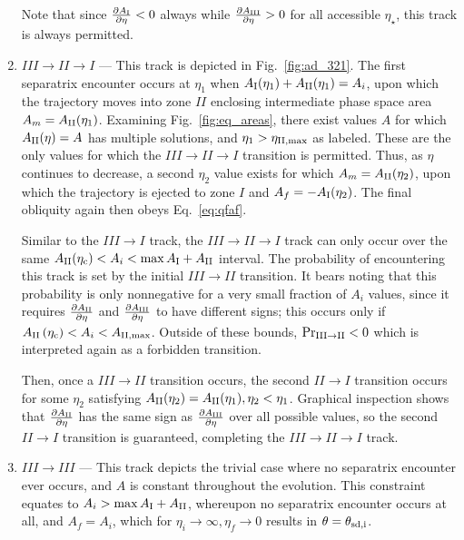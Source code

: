 \documentclass[
        fleqn,
        usenatbib,
        referee,
    ]{mnras}
\newcommand*{\pd}[2]{\frac{\partial#1}{\partial#2}}
\newcommand*{\p}[1]{\left(#1\right)}
\begin{document}
\begin{enumerate}
        Note that since $\pd{A_{\rm I}}{\eta} < 0$ always while $\pd{A_{\rm
        III}}{\eta} > 0$ for all accessible $\eta_{\star}$, this track is always
        permitted.

    \item $III \to II \to I$ --- This track is depicted in Fig.~\ref{fig:ad_321}.
        The first separatrix encounter occurs at $\eta_1$ when $A_{\rm
        I}(\eta_1) + A_{\rm II}(\eta_1) = A_i$, upon which the trajectory moves
        into zone $II$ enclosing intermediate phase space area $A_m = A_{\rm
        II}(\eta_1)$. Examining Fig.~\ref{fig:eq_areas}, there exist values $A$
        for which $A_{\rm II}(\eta) = A$ has multiple solutions, and $\eta_1 >
        \eta_{\rm II, \max}$ as labeled. These are the only values for which the
        $III \to II \to I$ transition is permitted. Thus, as $\eta$ continues to
        decrease, a second $\eta_2$ value exists for which $A_m = A_{\rm
        II}(\eta_2)$, upon which the trajectory is ejected to zone $I$ and $A_f
        = -A_{\rm I}(\eta_2)$. The final obliquity again then obeys
        Eq.~\eqref{eq:qfaf}.

        Similar to the $III \to I$ track, the $III \to II \to I$ track can only
        occur over the same $A_{\rm II}(\eta_{\rm c}) < A_i < \max A_{\rm I} + A_{\rm
        II}$ interval. The probability of encountering this track is set by the
        initial $III \to II$ transition. It bears noting that this probability
        is only nonnegative for a very small fraction of $A_i$ values, since it
        requires $\pd{A_{\rm II}}{\eta}$ and $\pd{A_{\rm III}}{\eta}$ to have
        different signs; this occurs only if $A_{\rm II}\p{\eta_{\rm c}} < A_i <
        A_{\rm II, \max}$. Outside of these bounds, $\Pr_{\rm III \to II} < 0$
        which is interpreted again as a forbidden transition.

        Then, once a $III \to II$ transition occurs, the second $II \to I$
        transition occurs for some $\eta_2$ satisfying $A_{\rm II}(\eta_2) =
        A_{\rm II}(\eta_1), \eta_2 < \eta_1$. Graphical inspection shows that
        $\pd{A_{\rm II}}{\eta}$ has the same sign as $\pd{A_{\rm III}}{\eta}$
        over all possible values, so the second $II \to I$ transition is
        guaranteed, completing the $III \to II \to I$ track.

    \item $III \to III$ --- This track depicts the trivial case where no
        separatrix encounter ever occurs, and $A$ is constant throughout the
        evolution. This constraint equates to $A_i > \max A_{\rm I} + A_{\rm
        II}$, whereupon no separatrix encounter occurs at all, and $A_f = A_i$,
        which for $\eta_i \to \infty, \eta_f \to 0$ results in $\theta =
        \theta_{\rm sd, i}$.


\end{enumerate}
\end{document}
